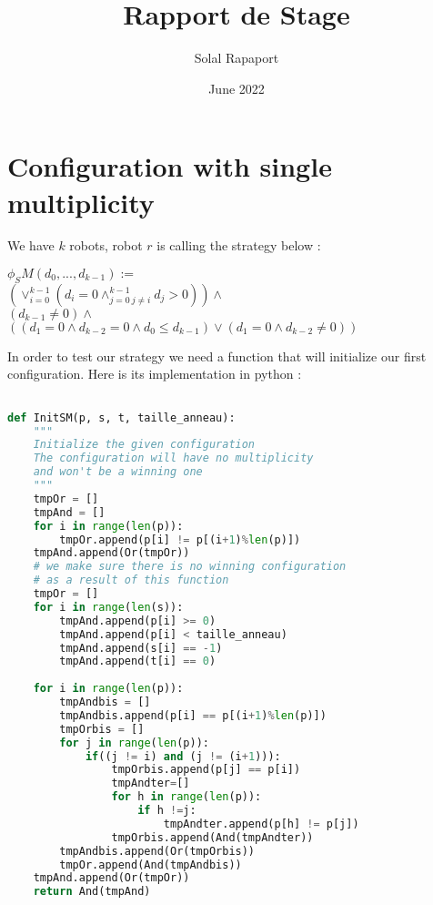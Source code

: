 \documentclass{article}
\title{Rapport de Stage}
\author{Solal Rapaport }
\date{June 2022}
\begin{document}
\maketitle

\section{Configuration with single multiplicity}

We have $k$ robots, robot $r$ is calling the strategy below :
\begin{center}
$\phi_SM(d_0, ..., d_{k-1}):=$\\
$(\lor_{i=0}^{k-1}(d_i = 0\land_{j=0\ j\not=i}^{k-1} d_j > 0))\land$\\
$(d_{k-1} \not= 0) \land $\\
$((d_1 = 0 \land d_{k-2} = 0 \land d_0 \leq d_{k-1}) \lor (d_1 = 0 \land d_{k-2} \not= 0))$
\end{center}

In order to test our strategy we need a function that will initialize our first configuration. Here is its implementation in python :

\begin{lstlisting}[language=Python]

def InitSM(p, s, t, taille_anneau):
    """
    Initialize the given configuration
    The configuration will have no multiplicity
    and won't be a winning one
    """
    tmpOr = []
    tmpAnd = []
    for i in range(len(p)):
        tmpOr.append(p[i] != p[(i+1)%len(p)])
    tmpAnd.append(Or(tmpOr))
    # we make sure there is no winning configuration
    # as a result of this function
    tmpOr = []
    for i in range(len(s)):
        tmpAnd.append(p[i] >= 0)
        tmpAnd.append(p[i] < taille_anneau)
        tmpAnd.append(s[i] == -1)
        tmpAnd.append(t[i] == 0)
    
    for i in range(len(p)):
        tmpAndbis = []
        tmpAndbis.append(p[i] == p[(i+1)%len(p)])
        tmpOrbis = []
        for j in range(len(p)):
            if((j != i) and (j != (i+1))):
                tmpOrbis.append(p[j] == p[i])
                tmpAndter=[]
                for h in range(len(p)):
                    if h !=j:
                        tmpAndter.append(p[h] != p[j])
                tmpOrbis.append(And(tmpAndter))
        tmpAndbis.append(Or(tmpOrbis))
        tmpOr.append(And(tmpAndbis))
    tmpAnd.append(Or(tmpOr))
    return And(tmpAnd)
\end{lstlisting}
\end{document}

